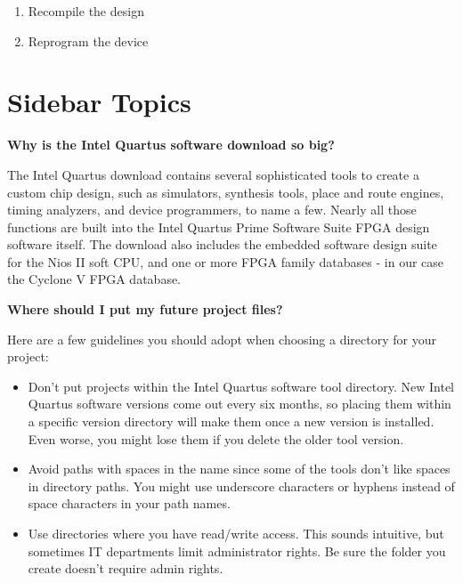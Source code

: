 \begin{flushleft}
\begin{enumerate}[
	leftmargin=*,
	align=left]
\item Recompile the design

\item Reprogram the device

\end{enumerate}

\end{flushleft}

\section*{Sidebar Topics}
\begin{flushleft}

\hypertarget{side1}{\textbf{Why is the Intel Quartus software download so big?}}
\newline
The Intel Quartus download contains several sophisticated tools to create a custom chip design,  such as simulators, synthesis tools, place and route engines, timing analyzers, and device programmers, to name a few. Nearly all those functions are built into the Intel Quartus Prime Software Suite FPGA design software itself. The download also includes the embedded software design suite for the Nios II soft CPU, and one or more FPGA family databases - in our case the Cyclone V FPGA database.
\newline

\hypertarget{side10}{\textbf{Where should I put my future project files?}}
\newline
Here are a few guidelines you should adopt when choosing a directory for your project:

\begin{itemize}
\item Don't put projects within the Intel Quartus software tool directory. New Intel Quartus software versions come out every six months, so placing them within a specific version directory will make them  once a new version is installed. Even worse, you might lose them if you delete the older tool version.
\item Avoid paths with spaces in the name since some of the tools don't like spaces in directory paths.  You might use underscore characters or hyphens instead of space characters in your path names.
\item Use directories where you have read/write access. This sounds intuitive, but sometimes IT departments limit administrator rights. Be sure the folder you create doesn't require admin rights.
\end{itemize}


\end{flushleft}
